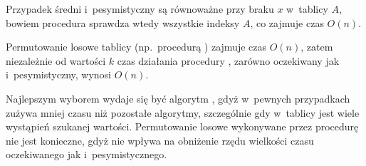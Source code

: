 \subproblem %
Przypadek średni i~pesymistyczny są równoważne przy braku $x$ w~tablicy $A$, bowiem procedura sprawdza wtedy wszystkie indeksy $A$, co zajmuje czas $O(n)$.

\subproblem %
Permutowanie losowe tablicy (np.\ procedurą ) zajmuje czas $O(n)$, zatem niezależnie od wartości $k$ czas działania procedury , zarówno oczekiwany jak i~pesymistyczny, wynosi $O(n)$.

\subproblem %
Najlepszym wyborem wydaje się być algorytm , gdyż w~pewnych przypadkach zużywa mniej czasu niż pozostałe algorytmy, szczególnie gdy w~tablicy jest wiele wystąpień szukanej wartości. Permutowanie losowe wykonywane przez procedurę  nie jest konieczne, gdyż nie wpływa na obniżenie rzędu wielkości czasu oczekiwanego jak i~pesymistycznego.

\endinput
